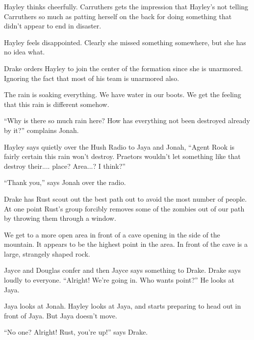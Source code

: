    {\color[RGB]{255,153,0}  } Hayley thinks cheerfully.  Carruthers gets the impression that Hayley's not telling Carruthers so much as patting herself on the back for doing something that didn't appear to end in disaster.


Hayley feels disappointed.  Clearly she missed something somewhere, but she has no idea what.



Drake orders Hayley to join the center of the formation since she is unarmored.  Ignoring the fact that most of his team is unarmored also.

The rain is soaking everything.  We have water in our boots.  We get the feeling that this rain is different somehow.

``Why is there so much rain here? How has everything not been destroyed already by it?'' complains Jonah.


Hayley says quietly over the Hush Radio to Jaya and Jonah, ``Agent Rook is fairly certain this rain won't destroy.  Praetors wouldn't let something like that destroy their.... place?  Area...?  I think?''

``Thank you,'' says Jonah over the radio.

Drake has Rust scout out the best path out to avoid the most number of people.  At one point Rust's group forcibly removes some of the zombies out of our path by throwing them through a window.  







We get to a more open area in front of a cave opening in the side of the mountain.  It appears to be the highest point in the area.  In front of the cave is a large, strangely shaped rock.

Jayce and Douglas confer and then Jayce says something to Drake.  Drake says loudly to everyone. ``Alright!  We're going in.  Who wants point?''  He looks at Jaya.

Jaya looks at Jonah.   Hayley looks at Jaya, and starts preparing to head out in front of Jaya.  But Jaya doesn't move.

``No one?  Alright!  Rust, you're up!'' says Drake.

